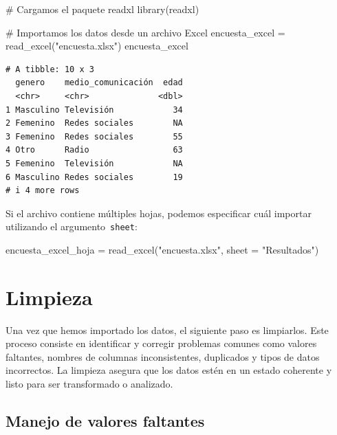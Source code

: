 \documentclass[
  letterpaper,
  DIV=11,
  numbers=noendperiod,
  twoside]{scrreprt}
\newenvironment{Shaded}{\begin{snugshade}}{\end{snugshade}}
\newcommand{\AttributeTok}[1]{\textcolor[rgb]{0.40,0.45,0.13}{#1}}
\newcommand{\CommentTok}[1]{\textcolor[rgb]{0.37,0.37,0.37}{#1}}
\newcommand{\FunctionTok}[1]{\textcolor[rgb]{0.28,0.35,0.67}{#1}}
\newcommand{\NormalTok}[1]{\textcolor[rgb]{0.00,0.23,0.31}{#1}}
\newcommand{\OtherTok}[1]{\textcolor[rgb]{0.00,0.23,0.31}{#1}}
\newcommand{\StringTok}[1]{\textcolor[rgb]{0.13,0.47,0.30}{#1}}
\begin{document}
\begin{Shaded}
\begin{Highlighting}[]
\CommentTok{\# Cargamos el paquete readxl}
\FunctionTok{library}\NormalTok{(readxl)}
\end{Highlighting}
\end{Shaded}

\begin{Shaded}
\begin{Highlighting}[]
\CommentTok{\# Importamos los datos desde un archivo Excel}
\NormalTok{encuesta\_excel }\OtherTok{=} \FunctionTok{read\_excel}\NormalTok{(}\StringTok{"encuesta.xlsx"}\NormalTok{)}
\NormalTok{encuesta\_excel}
\end{Highlighting}
\end{Shaded}

\begin{verbatim}
# A tibble: 10 x 3
  genero    medio_comunicación  edad
  <chr>     <chr>              <dbl>
1 Masculino Televisión            34
2 Femenino  Redes sociales        NA
3 Femenino  Redes sociales        55
4 Otro      Radio                 63
5 Femenino  Televisión            NA
6 Masculino Redes sociales        19
# i 4 more rows
\end{verbatim}

Si el archivo contiene múltiples hojas, podemos especificar cuál
importar utilizando el argumento~\texttt{sheet}:

\begin{Shaded}
\begin{Highlighting}[]
\NormalTok{encuesta\_excel\_hoja }\OtherTok{=} \FunctionTok{read\_excel}\NormalTok{(}\StringTok{"encuesta.xlsx"}\NormalTok{, }
                                  \AttributeTok{sheet =} \StringTok{"Resultados"}\NormalTok{)}
\end{Highlighting}
\end{Shaded}

\chapter{Limpieza}\label{limpieza}

Una vez que hemos importado los datos, el siguiente paso es limpiarlos.
Este proceso consiste en identificar y corregir problemas comunes como
valores faltantes, nombres de columnas inconsistentes, duplicados y
tipos de datos incorrectos. La limpieza asegura que los datos estén en
un estado coherente y listo para ser transformado o analizado.

\section{Manejo de valores faltantes}\label{manejo-de-valores-faltantes}
\end{document}
